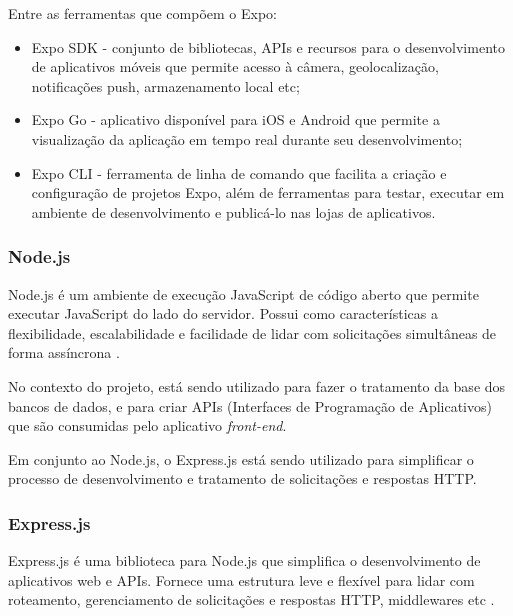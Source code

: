 \begin{description}
    \item Entre as ferramentas que compõem o Expo:
          \begin{itemize}
              \item Expo SDK - conjunto de bibliotecas, APIs e recursos para o desenvolvimento de aplicativos móveis que permite acesso 
              à câmera, geolocalização, notificações push, armazenamento local etc;

              \item Expo Go - aplicativo disponível para iOS e Android que permite a visualização da aplicação em tempo real durante seu 
              desenvolvimento;

              \item Expo CLI - ferramenta de linha de comando que facilita a criação e configuração de projetos Expo, além de ferramentas para 
              testar, executar em ambiente de desenvolvimento e publicá-lo nas lojas de aplicativos.
          \end{itemize}
\end{description}

\subsubsection{Node.js}
\label{sec:Node.js}
Node.js é um ambiente de execução JavaScript de código aberto que permite executar JavaScript do lado do servidor. Possui como características 
a flexibilidade, escalabilidade e facilidade de lidar com solicitações simultâneas de forma assíncrona \cite{nodejs}.

No contexto do projeto, está sendo utilizado para fazer o tratamento da base dos bancos de dados, e para criar 
APIs (Interfaces de Programação de Aplicativos) que são consumidas pelo aplicativo \textit{front-end}.

Em conjunto ao Node.js, o Express.js está sendo utilizado para simplificar o processo de desenvolvimento e tratamento de solicitações e respostas HTTP.

\subsubsection{Express.js}
\label{sec:Express.js}
Express.js é uma biblioteca para Node.js que simplifica o desenvolvimento de aplicativos web e APIs. Fornece uma estrutura leve e flexível para 
lidar com roteamento, gerenciamento de solicitações e respostas HTTP, middlewares etc \cite{expressjs}.

